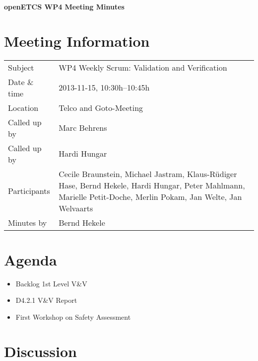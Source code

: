 \documentclass[a4paper, 11pt]{article}
\begin{document}
{\begin{center}\huge\bf openETCS WP4 Meeting Minutes\end{center}}
\section{Meeting Information}

\renewcommand{\arraystretch}{1.5}
\begin{supertabular}{m{.2\textwidth}m{.8\textwidth}}
Subject & WP4 Weekly Scrum: Validation and Verification\\
Date \& time & 2013-11-15, 10:30h--10:45h\\
Location & Telco and Goto-Meeting\\
Called up by & Marc Behrens\\
Called up by & Hardi Hungar\\
Participants &
Cecile Braunstein,
Michael Jastram,
Klaus-R\"udiger Hase,
Bernd Hekele,
Hardi Hungar,
Peter Mahlmann,
Marielle Petit-Doche,
Merlin Pokam,
Jan Welte,
Jan Welvaarts
\\

Minutes by & Bernd Hekele\\

\end{supertabular}
\renewcommand{\arraystretch}{1.0}


\section{{Agenda}}
\begin{itemize}
\item Backlog 1st Level V\&V
\item D4.2.1 V\&V Report
\item First Workshop on Safety Assessment
\end{itemize}

\section{Discussion}
\end{document}
